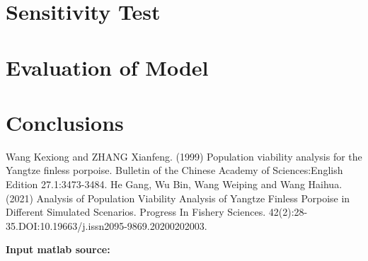 \documentclass{mcmthesis}
\numberwithin{figure}{section}
\numberwithin{table}{section}
\numberwithin{equation}{section}
\begin{document}
\section{Sensitivity Test}

\section{Evaluation of Model}

\section{Conclusions}

\newpage
{}
\memodate{\today}

\begin{memo}[report]
  
\end{memo}




\newpage


\begin{thebibliography}{99}
 Wang Kexiong and ZHANG Xianfeng. (1999) Population viability analysis for the Yangtze finless porpoise. Bulletin of the Chinese Academy of Sciences:English Edition 27.1:3473-3484.
 He Gang, Wu Bin, Wang Weiping and Wang Haihua. (2021) Analysis of Population Viability Analysis of Yangtze Finless Porpoise in Different Simulated Scenarios. Progress In Fishery Sciences. 42(2):28-35.DOI:10.19663/j.issn2095-9869.20200202003.
\end{thebibliography}


\newpage


\lhead{\small\sffamily \team}

\begin{appendices}




\textbf{\textcolor[rgb]{0.98,0.00,0.00}{Input matlab source:}}
% 
% 
% 


\end{appendices}
\end{document}
